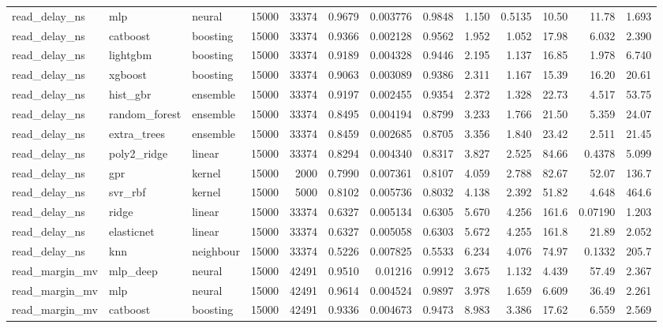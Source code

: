 \begin{table}[!t]
\begin{tabular}{lllrrrrrrrrrr}
read\_delay\_ns & mlp & neural & 15000 & 33374 & 0.9679 & 0.003776 & 0.9848 & 1.150 & 0.5135 & 10.50 & 11.78 & 1.693 \\
read\_delay\_ns & catboost & boosting & 15000 & 33374 & 0.9366 & 0.002128 & 0.9562 & 1.952 & 1.052 & 17.98 & 6.032 & 2.390 \\
read\_delay\_ns & lightgbm & boosting & 15000 & 33374 & 0.9189 & 0.004328 & 0.9446 & 2.195 & 1.137 & 16.85 & 1.978 & 6.740 \\
read\_delay\_ns & xgboost & boosting & 15000 & 33374 & 0.9063 & 0.003089 & 0.9386 & 2.311 & 1.167 & 15.39 & 16.20 & 20.61 \\
read\_delay\_ns & hist\_gbr & ensemble & 15000 & 33374 & 0.9197 & 0.002455 & 0.9354 & 2.372 & 1.328 & 22.73 & 4.517 & 53.75 \\
read\_delay\_ns & random\_forest & ensemble & 15000 & 33374 & 0.8495 & 0.004194 & 0.8799 & 3.233 & 1.766 & 21.50 & 5.359 & 24.07 \\
read\_delay\_ns & extra\_trees & ensemble & 15000 & 33374 & 0.8459 & 0.002685 & 0.8705 & 3.356 & 1.840 & 23.42 & 2.511 & 21.45 \\
read\_delay\_ns & poly2\_ridge & linear & 15000 & 33374 & 0.8294 & 0.004340 & 0.8317 & 3.827 & 2.525 & 84.66 & 0.4378 & 5.099 \\
read\_delay\_ns & gpr & kernel & 15000 & 2000 & 0.7990 & 0.007361 & 0.8107 & 4.059 & 2.788 & 82.67 & 52.07 & 136.7 \\
read\_delay\_ns & svr\_rbf & kernel & 15000 & 5000 & 0.8102 & 0.005736 & 0.8032 & 4.138 & 2.392 & 51.82 & 4.648 & 464.6 \\
read\_delay\_ns & ridge & linear & 15000 & 33374 & 0.6327 & 0.005134 & 0.6305 & 5.670 & 4.256 & 161.6 & 0.07190 & 1.203 \\
read\_delay\_ns & elasticnet & linear & 15000 & 33374 & 0.6327 & 0.005058 & 0.6303 & 5.672 & 4.255 & 161.8 & 21.89 & 2.052 \\
read\_delay\_ns & knn & neighbour & 15000 & 33374 & 0.5226 & 0.007825 & 0.5533 & 6.234 & 4.076 & 74.97 & 0.1332 & 205.7 \\
read\_margin\_mv & mlp\_deep & neural & 15000 & 42491 & 0.9510 & 0.01216 & 0.9912 & 3.675 & 1.132 & 4.439 & 57.49 & 2.367 \\
read\_margin\_mv & mlp & neural & 15000 & 42491 & 0.9614 & 0.004524 & 0.9897 & 3.978 & 1.659 & 6.609 & 36.49 & 2.261 \\
read\_margin\_mv & catboost & boosting & 15000 & 42491 & 0.9336 & 0.004673 & 0.9473 & 8.983 & 3.386 & 17.62 & 6.559 & 2.569 \\

\end{tabular}
\end{table}
